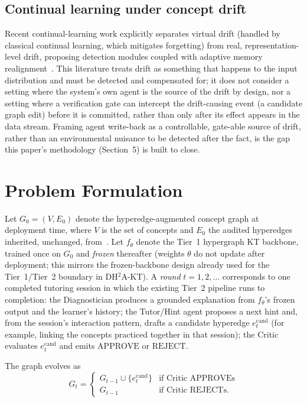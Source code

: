 \documentclass[review,12pt]{elsarticle}
\begin{document}
\subsection{Continual learning under concept drift}

Recent continual-learning work explicitly separates virtual drift
(handled by classical continual learning, which mitigates forgetting)
from real, representation-level drift, proposing detection modules
coupled with adaptive memory realignment~\cite{ashrafee2025amr}. This
literature treats drift as something that happens to the input
distribution and must be detected and compensated for; it does not
consider a setting where the system's own agent is the source of the
drift by design, nor a setting where a verification gate can intercept
the drift-causing event (a candidate graph edit) before it is committed,
rather than only after its effect appears in the data stream. Framing
agent write-back as a controllable, gate-able source of drift, rather
than an environmental nuisance to be detected after the fact, is the gap
this paper's methodology (Section~5) is built to close.

\section{Problem Formulation}

Let $G_0 = (V, E_0)$ denote the hyperedge-augmented concept graph at
deployment time, where $V$ is the set of concepts and $E_0$ the audited
hyperedges inherited, unchanged, from~\cite{daominh2026p0}. Let
$f_\theta$ denote the Tier~1 hypergraph KT backbone, trained once on
$G_0$ and \emph{frozen} thereafter (weights $\theta$ do not update after
deployment; this mirrors the frozen-backbone design already used for the
Tier~1/Tier~2 boundary in DH$^2$A-KT). A \emph{round} $t = 1, 2, \dots$
corresponds to one completed tutoring session in which the existing
Tier~2 pipeline runs to completion: the Diagnostician produces a
grounded explanation from $f_\theta$'s frozen output and the learner's
history; the Tutor/Hint agent proposes a next hint and, from the
session's interaction pattern, drafts a candidate hyperedge
$e_t^{\text{cand}}$ (for example, linking the concepts practiced together
in that session); the Critic evaluates $e_t^{\text{cand}}$ and emits
$\text{APPROVE}$ or $\text{REJECT}$.

The graph evolves as
\[
G_t =
\begin{cases}
G_{t-1} \cup \{e_t^{\text{cand}}\} & \text{if Critic APPROVEs} \\
G_{t-1} & \text{if Critic REJECTs.}
\end{cases}
\]
\end{document}
